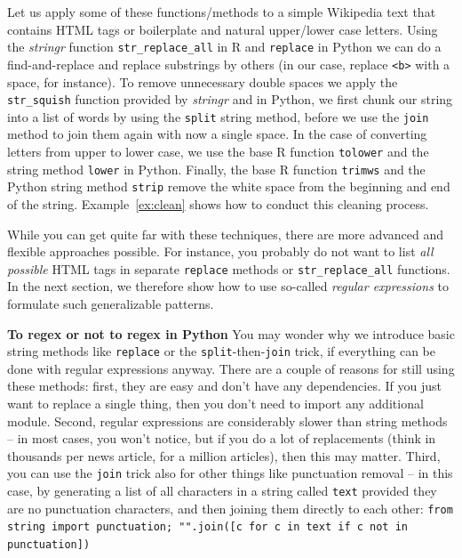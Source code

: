 Let us apply some of these functions/methods to a simple Wikipedia
text that contains HTML tags or boilerplate and natural upper/lower
case letters.
Using the \emph{stringr} function \texttt{str\_replace\_all} in R
and \texttt{replace} in Python we can do a find-and-replace and replace substrings
by others (in our case, replace \verb|<b>| with a space, for instance).
To remove unnecessary double spaces we apply the \texttt{str\_squish} function provided by \emph{stringr} and in Python,
we first chunk our string into a list of words by using the \texttt{split} string method, before we use the \texttt{join} method
to join them again with now a single space.
In the case of converting letters from upper to lower case, we use the base R function \texttt{tolower} and the string
method \texttt{lower} in Python.
Finally, the base R function \texttt{trimws} and the
Python string method \texttt{strip} remove the white space from the beginning
and end of the string.
Example~\ref{ex:clean} shows how to conduct this cleaning process.

While you can get quite far with these techniques, there are more advanced and flexible approaches possible.
For instance, you probably do not want to list \emph{all possible} HTML tags in separate \texttt{replace} methods or \texttt{str\_replace\_all} functions. In the next section, we therefore show how to use so-called \emph{regular expressions} to formulate such generalizable patterns.


\begin{feature}
  \textbf{To regex or not to regex in Python}
  You may wonder why we introduce basic string methods like \texttt{replace} or the \texttt{split}-then-\texttt{join} trick, if everything can be done with regular expressions anyway. There are a couple of reasons for still using these methods: first, they are easy and don't have any dependencies. If you just want to replace a single thing, then you don't need to import any additional module. Second, regular expressions are considerably slower than string methods -- in most cases, you won't notice, but if you do a lot of replacements (think in thousands per news article, for a million  articles), then this may matter. Third, you can use the \texttt{join} trick also for other things like punctuation removal -- in this case, by generating a list of all characters in a string called \verb|text| provided they are no punctuation characters, and then joining them directly to each other:
\verb|from string import punctuation; "".join([c for c in text if c not in punctuation])|
  \end{feature}


